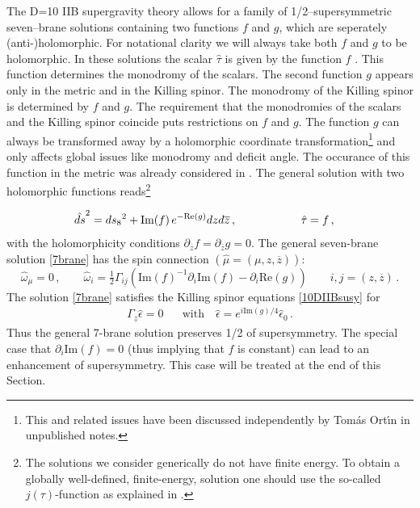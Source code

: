 \documentclass[12pt,a4paper]{article}
\begin{document}
The D=10 IIB supergravity theory allows for a family of
1/2--supersymmetric seven--brane solutions containing two
functions $f$ and $g$, which are seperately (anti-)holomorphic.
For notational clarity we will always take both $f$ and $g$ to be
holomorphic. In these solutions the scalar $\hat{\tau}$ is given
by the function $f$ \cite{Greene:1990ya,Gibbons:1996vg}. This
function determines the monodromy of the scalars. The second
function $g$ appears only in the metric and in the Killing spinor.
The monodromy of the Killing spinor is determined by $f$ and $g$.
The requirement that the monodromies of the scalars and the
Killing spinor coincide puts restrictions on $f$ and $g$. The
function $g$ can always be transformed away by a holomorphic
coordinate transformation\footnote{This and related issues have
been discussed independently by Tom\'as Ort\'\i n in unpublished
notes.} and only affects global issues like monodromy and deficit
angle. The occurance of this function in the metric was already
considered in \cite{Greene:1990ya, Meessen:1998qm}. The general
solution with two holomorphic functions reads\footnote{The solutions 
we consider generically do not have finite energy. 
To obtain a globally well-defined, finite-energy,
solution one should use the so-called $j(\tau)$-function as explained in
\cite{Greene:1990ya}.}

\begin{align}
  \hat{ds}^2 & = ds_8{}^2 + \text{Im}(f)\,e^{-\text{Re}(g)} dz d\overline{z} \,,
  \hskip 2truecm \hat \tau  =  f\, ,
\label{7brane}
\end{align}
%
with the holomorphicity conditions $\partial_{\overline z} f =
\partial_{\overline z} g=0$. The general seven-brane solution \eqref{7brane}
has the spin connection $(\hat \mu = (\mu,z,\overline{z}))$:
\begin{equation}
  \hat{\omega}_\mu=0 \,, \qquad
  \hat{\omega}_i = \tfrac{1}{2} \Gamma_{\underline{ij}}
  \left(
  \text{Im} (f)^{-1} \partial_i \text{Im} (f)
  - \partial_i \text{Re}(g)
  \right)
  \qquad i,j=(z,\overline{z}) \, .
\end{equation}
The solution \eqref{7brane} satisfies the Killing spinor equations \eqref{10DIIBsusy} for
\begin{align}
  \Gamma_{\underline{z}} \hat{\epsilon} = 0 \text{~~~~ with ~~}
    \hat{\epsilon} = e^{i \text{Im}(g)/4} \hat{\epsilon}_0 \,.
\label{Killing7brane}
\end{align}
Thus the general 7-brane solution preserves 1/2 of supersymmetry.
The special case that $\partial_i \text{Im}(f) = 0$ (thus
implying that $f$ is constant) can lead to an
enhancement of supersymmetry. This case will be treated at the end
of this Section.
\end{document}
